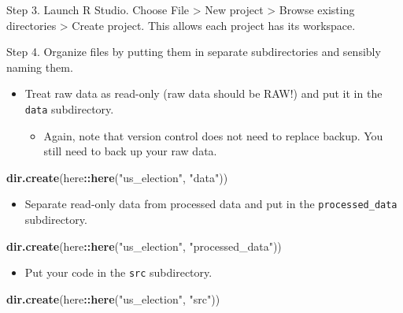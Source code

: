 \documentclass[
]{book}
\newenvironment{Shaded}{\begin{snugshade}}{\end{snugshade}}
\newcommand{\FunctionTok}[1]{\textcolor[rgb]{0.13,0.29,0.53}{\textbf{#1}}}
\newcommand{\NormalTok}[1]{#1}
\newcommand{\SpecialCharTok}[1]{\textcolor[rgb]{0.81,0.36,0.00}{\textbf{#1}}}
\newcommand{\StringTok}[1]{\textcolor[rgb]{0.31,0.60,0.02}{#1}}
\providecommand{\tightlist}{%
  \setlength{\itemsep}{0pt}\setlength{\parskip}{0pt}}
\begin{document}
Step 3. Launch R Studio. Choose File \textgreater{} New project \textgreater{} Browse existing directories \textgreater{} Create project. This allows each project has its workspace.

Step 4. Organize files by putting them in separate subdirectories and sensibly naming them.

\begin{itemize}
\item
  Treat raw data as read-only (raw data should be RAW!) and put it in the \texttt{data} subdirectory.

  \begin{itemize}
  \tightlist
  \item
    Again, note that version control does not need to replace backup. You still need to back up your raw data.
  \end{itemize}
\end{itemize}

\begin{Shaded}
\begin{Highlighting}[]
\FunctionTok{dir.create}\NormalTok{(here}\SpecialCharTok{::}\FunctionTok{here}\NormalTok{(}\StringTok{"us\_election"}\NormalTok{, }\StringTok{"data"}\NormalTok{))}
\end{Highlighting}
\end{Shaded}

\begin{itemize}
\tightlist
\item
  Separate read-only data from processed data and put in the \texttt{processed\_data} subdirectory.
\end{itemize}

\begin{Shaded}
\begin{Highlighting}[]
\FunctionTok{dir.create}\NormalTok{(here}\SpecialCharTok{::}\FunctionTok{here}\NormalTok{(}\StringTok{"us\_election"}\NormalTok{, }\StringTok{"processed\_data"}\NormalTok{))}
\end{Highlighting}
\end{Shaded}

\begin{itemize}
\tightlist
\item
  Put your code in the \texttt{src} subdirectory.
\end{itemize}

\begin{Shaded}
\begin{Highlighting}[]
\FunctionTok{dir.create}\NormalTok{(here}\SpecialCharTok{::}\FunctionTok{here}\NormalTok{(}\StringTok{"us\_election"}\NormalTok{, }\StringTok{"src"}\NormalTok{))}
\end{Highlighting}
\end{Shaded}
\end{document}
